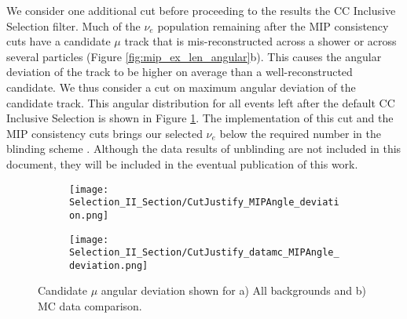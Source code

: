 We consider one additional cut before proceeding to the results the CC Inclusive Selection filter.  Much of the $\nu_e$ population remaining after the MIP consistency cuts have a candidate $\mu$ track that is mis-reconstructed across a shower or across several particles (Figure \ref{fig:mip_ex_len_angular}b).  This causes the angular deviation of the track to be higher on average than a well-reconstructed candidate.  We thus consider a cut on maximum angular deviation of the candidate track.  This angular distribution for all events left after the default CC Inclusive Selection is shown in Figure \ref{fig:cutjust_sel2_multall_deviation}.  The implementation of this cut and the MIP consistency cuts brings our selected $\nu_e$ below the required number in the blinding scheme \cite{bib:jz_unblinding_note}. Although the data results of unblinding are not included in this document, they will be included in the eventual publication of this work.
\begin{figure}[t!]
\centering
  \begin{subfigure}[t]{0.35\textwidth}
    \centering
\texttt{[image: Selection\_II\_Section/CutJustify\_MIPAngle\_deviation.png]}
    \caption{ }
  \end{subfigure} 
  \hspace{30mm}
  \begin{subfigure}[t]{0.35\textwidth}
    \centering
\texttt{[image: Selection\_II\_Section/CutJustify\_datamc\_MIPAngle\_deviation.png]}
    \caption{ }
  \end{subfigure} 
\caption{ Candidate $\mu$ angular deviation shown for a) All backgrounds and b) MC data comparison. }
\label{fig:cutjust_sel2_multall_deviation}
\end{figure}

\clearpage

